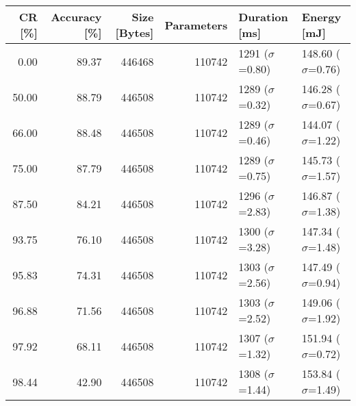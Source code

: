 \begin{tabular}{rrrrll}
\toprule
   CR [\%] & Accuracy [\%] & Size [Bytes] & Parameters &         Duration [ms] &             Energy [mJ] \\
\midrule
      0.00 &         89.37 &       446468 &     110742 &  1291 ($\sigma$=0.80) &  148.60 ($\sigma$=0.76) \\
     50.00 &         88.79 &       446508 &     110742 &  1289 ($\sigma$=0.32) &  146.28 ($\sigma$=0.67) \\
     66.00 &         88.48 &       446508 &     110742 &  1289 ($\sigma$=0.46) &  144.07 ($\sigma$=1.22) \\
     75.00 &         87.79 &       446508 &     110742 &  1289 ($\sigma$=0.75) &  145.73 ($\sigma$=1.57) \\
     87.50 &         84.21 &       446508 &     110742 &  1296 ($\sigma$=2.83) &  146.87 ($\sigma$=1.38) \\
     93.75 &         76.10 &       446508 &     110742 &  1300 ($\sigma$=3.28) &  147.34 ($\sigma$=1.48) \\
     95.83 &         74.31 &       446508 &     110742 &  1303 ($\sigma$=2.56) &  147.49 ($\sigma$=0.94) \\
     96.88 &         71.56 &       446508 &     110742 &  1303 ($\sigma$=2.52) &  149.06 ($\sigma$=1.92) \\
     97.92 &         68.11 &       446508 &     110742 &  1307 ($\sigma$=1.32) &  151.94 ($\sigma$=0.72) \\
     98.44 &         42.90 &       446508 &     110742 &  1308 ($\sigma$=1.44) &  153.84 ($\sigma$=1.49) \\
\bottomrule
\end{tabular}
